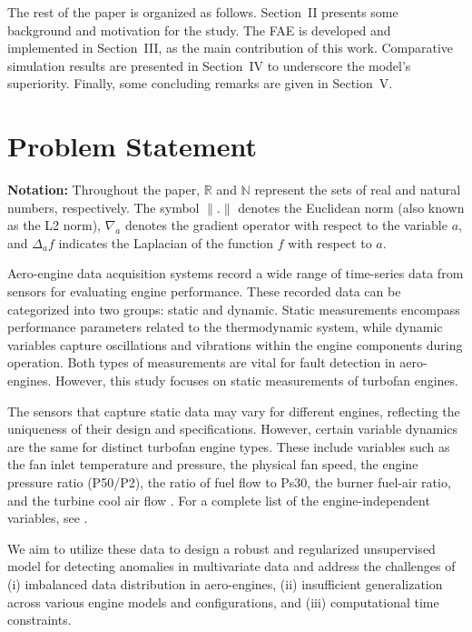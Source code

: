 \documentclass[journal]{IEEEtran}
\begin{document}
The rest of the paper is organized as follows. Section~II presents some background and motivation for the study. The FAE is developed and implemented in Section~III, as the main contribution of this work. Comparative simulation results are presented in Section~IV to underscore the model's superiority. Finally, some concluding remarks are given in Section~V.

\section{Problem Statement}

\textbf{Notation:} Throughout the paper, $\mathbb{R}$ and $\mathbb{N}$ represent the sets of real and natural numbers, respectively. The symbol $\|.\|$ denotes the Euclidean norm (also known as the L2 norm), $\nabla_a$ denotes the gradient operator with respect to the variable $a$, and $\Delta_{a}f$ indicates the Laplacian of the function $f$ with respect to $a$.


Aero-engine data acquisition systems record a wide range of time-series data from sensors for evaluating engine performance. These recorded data can be categorized into two groups: static and dynamic. Static measurements encompass performance parameters related to the thermodynamic system, while dynamic variables capture oscillations and vibrations within the engine components during operation. Both types of measurements are vital for fault detection in aero-engines. However, this study focuses on static measurements of turbofan engines. 

The sensors that capture static data may vary for different engines, reflecting the uniqueness of their design and specifications. However, certain variable dynamics are the same for distinct turbofan engine types. These include variables such as the fan inlet temperature and pressure, the physical fan speed, the engine pressure ratio (P50/P2), the ratio of fuel flow to Ps30, the burner fuel-air ratio, and the turbine cool air flow \cite{sensor3}. For a complete list of the engine-independent variables, see \cite{sensor3}.

We aim to utilize these data to design a robust and regularized unsupervised model for detecting anomalies in multivariate data and address the challenges of (i) imbalanced data distribution in aero-engines, (ii) insufficient generalization across various engine models and configurations, and (iii) computational time constraints.
\end{document}

